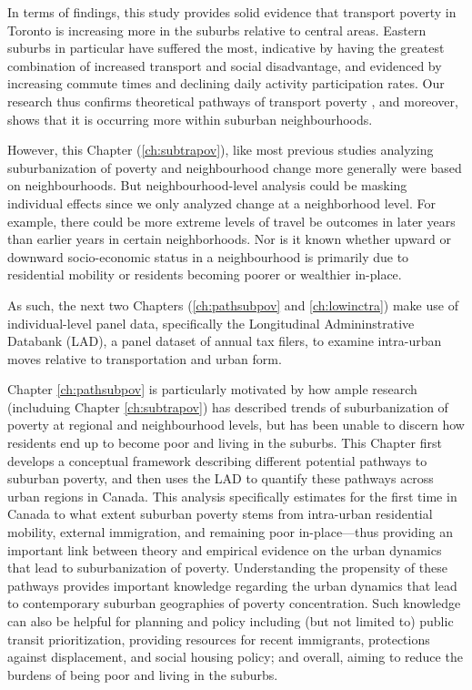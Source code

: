 In terms of findings, this study provides solid evidence that transport poverty in Toronto is increasing more in the suburbs relative to central areas. Eastern suburbs in particular have suffered the most, indicative by having the greatest combination of increased transport and social disadvantage, and evidenced by increasing commute times and declining daily activity participation rates. Our research thus confirms theoretical pathways of transport poverty \cite{lucas_transport_2012}, and moreover, shows that it is occurring more within suburban neighbourhoods.

However, this Chapter (\ref{ch:subtrapov}), like most previous studies analyzing suburbanization of poverty and neighbourhood change more generally \cite{ades_are_2012,breau_pulling_2018,grant_changing_2020} were based on neighbourhoods. But neighbourhood-level analysis could be masking individual effects since we only analyzed change at a neighborhood level. For example, there could be more extreme levels of travel be outcomes in later years than earlier years in certain neighborhoods. Nor is it known whether upward or downward socio-economic status in a neighbourhood is primarily due to residential mobility or residents becoming poorer or wealthier in-place.

As such, the next two Chapters (\ref{ch:pathsubpov} and \ref{ch:lowinctra}) make use of individual-level panel data, specifically the Longitudinal Admininstrative Databank (LAD), a panel dataset of annual tax filers, to examine intra-urban moves relative to transportation and urban form.

Chapter \ref{ch:pathsubpov} is particularly motivated by how ample research (includuing Chapter \ref{ch:subtrapov}) has described trends of suburbanization of poverty at regional and neighbourhood levels, but has been unable to discern how residents end up to become poor and living in the suburbs. This Chapter first develops a conceptual framework describing different potential pathways to suburban poverty, and then uses the LAD to quantify these pathways across urban regions in Canada. This analysis specifically estimates for the first time in Canada to what extent suburban poverty stems from intra-urban residential mobility, external immigration, and remaining poor in-place---thus providing an important link between theory and empirical evidence on the urban dynamics that lead to suburbanization of poverty. Understanding the propensity of these pathways provides important knowledge regarding the urban dynamics that lead to contemporary suburban geographies of poverty concentration. Such knowledge can also be helpful for planning and policy including (but not limited to) public transit prioritization, providing resources for recent immigrants, protections against displacement, and social housing policy; and overall, aiming to reduce the burdens of being poor and living in the suburbs.

